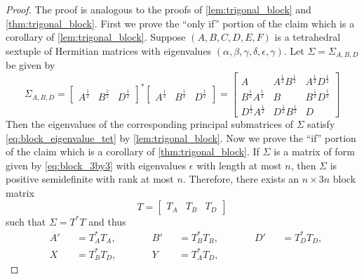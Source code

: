 \documentclass[notitlepage, 10pt]{article}
\begin{document}
\begin{proof}
    The proof is analogous to the proofs of \cref{lem:trigonal_block} and \cref{thm:trigonal_block}.
    First we prove the ``only if'' portion of the claim which is a corollary of \cref{lem:trigonal_block}.
    Suppose $(A,B,C,D,E,F)$ is a tetrahedral sextuple of Hermitian matrices with eigenvalues $(\alpha,\beta,\gamma,\delta,\epsilon,\gamma)$.
    Let $\Sigma = \Sigma_{A,B,D}$ be given by
    \begin{equation}
        \Sigma_{A,B,D} =
        \begin{bmatrix}
            A^{\frac{1}{2}} & B^{\frac{1}{2}} & D^{\frac{1}{2}}
        \end{bmatrix}^{*}
        \begin{bmatrix}
            A^{\frac{1}{2}} & B^{\frac{1}{2}} & D^{\frac{1}{2}}
        \end{bmatrix}
        =
        \begin{bmatrix}
            A & A^{\frac{1}{2}}B^{\frac{1}{2}} & A^{\frac{1}{2}}D^{\frac{1}{2}} \\
            B^{\frac{1}{2}}A^{\frac{1}{2}} & B & B^{\frac{1}{2}}D^{\frac{1}{2}} \\
            D^{\frac{1}{2}}A^{\frac{1}{2}} & D^{\frac{1}{2}}B^{\frac{1}{2}} & D
        \end{bmatrix}
    \end{equation}
    Then the eigenvalues of the corresponding principal submatrices of $\Sigma$ satisfy \cref{eq:block_eigenvalue_tet} by \cref{lem:trigonal_block}.
    Now we prove the ``if'' portion of the claim which is a corollary of \cref{thm:trigonal_block}.
    If $\Sigma$ is a matrix of form given by \cref{eq:block_3by3} with eigenvalues $\epsilon$ with length at most $n$, then $\Sigma$ is positive semidefinite with rank at most $n$.
    Therefore, there exists an $n\times 3n$ block matrix
    \begin{equation}
        T = \begin{bmatrix} T_{A} & T_{B} & T_{D} \end{bmatrix} 
    \end{equation}
    such that $\Sigma = T^{*}T$ and thus
    \begin{equation}
        \begin{alignedat}{6}
            &A' &&= T_{A}^{*}T_{A}, \qquad
            &&B' &&= T_{B}^{*}T_{B}, \qquad
            &&D' &&= T_{D}^{*}T_{D}, \\
            &X &&= T_{B}^{*}T_{D}, \qquad
            &&Y &&= T_{A}^{*}T_{D}, \qquad

\end{alignedat}
\end{equation}
\end{proof}
\end{document}
